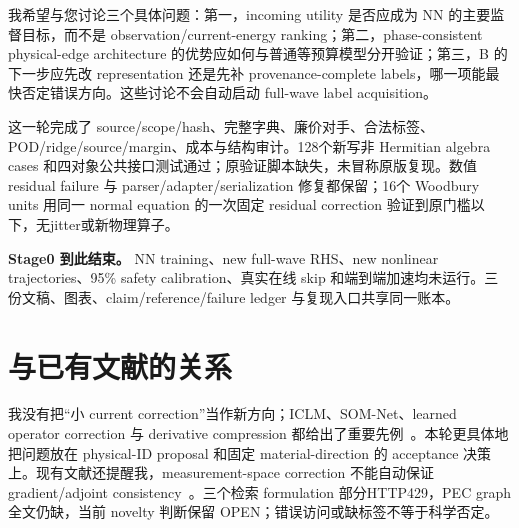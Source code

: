 \documentclass[UTF8,11pt,a4paper,fontset=fandol]{ctexart}
\begin{document}
我希望与您讨论三个具体问题：第一，incoming utility 是否应成为 NN 的主要监督目标，而不是 observation/current-energy ranking；第二，phase-consistent physical-edge architecture 的优势应如何与普通等预算模型分开验证；第三，B 的下一步应先改 representation 还是先补 provenance-complete labels，哪一项能最快否定错误方向。这些讨论不会自动启动 full-wave label acquisition。

这一轮完成了 source/scope/hash、完整字典、廉价对手、合法标签、POD/ridge/source/margin、成本与结构审计。128个新写非 Hermitian algebra cases 和四对象公共接口测试通过；原验证脚本缺失，未冒称原版复现。数值 residual failure 与 parser/adapter/serialization 修复都保留；16个 Woodbury units 用同一 normal equation 的一次固定 residual correction 验证到原门槛以下，无jitter或新物理算子。

\textbf{Stage0 到此结束。} NN training、new full-wave RHS、new nonlinear trajectories、95\% safety calibration、真实在线 skip 和端到端加速均未运行。三份文稿、图表、claim/reference/failure ledger 与复现入口共享同一账本。

\section*{与已有文献的关系}
我没有把“小 current correction”当作新方向；ICLM、SOM-Net、learned operator correction 与 derivative compression 都给出了重要先例~\cite{wei,som,lunz,dino}。本轮更具体地把问题放在 physical-ID proposal 和固定 material-direction 的 acceptance 决策上。现有文献还提醒我，measurement-space correction 不能自动保证 gradient/adjoint consistency~\cite{lunz}。三个检索 formulation 部分HTTP429，PEC graph全文仍缺，当前 novelty 判断保留 OPEN；错误访问或缺标签不等于科学否定。
\end{document}
